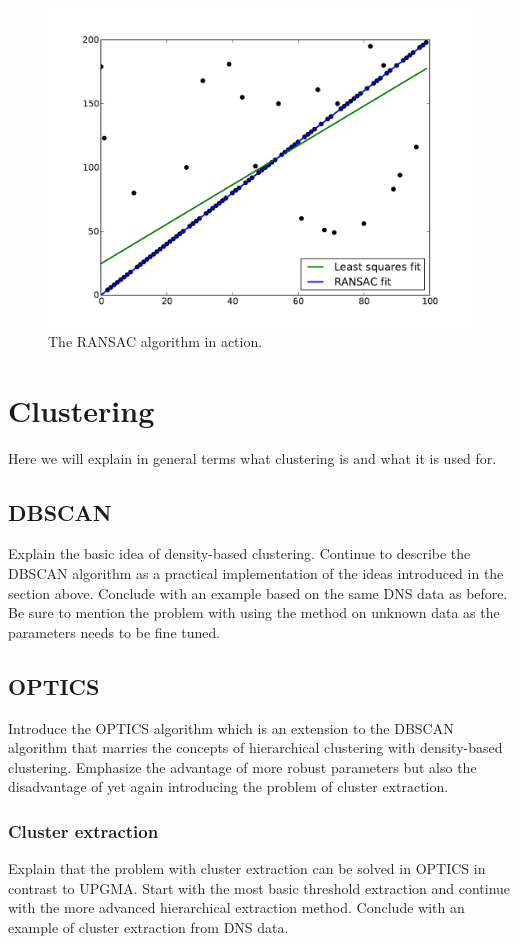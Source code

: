 \documentclass[a4paper]{report}
\begin{document}
\begin{figure}[h]
    \includegraphics[width=\linewidth]{ransac}
    \caption{The RANSAC algorithm in action.}
    \label{fig:ransac}
\end{figure}

\section{Clustering}
Here we will explain in general terms what clustering is and what it is used
for.

\subsection{DBSCAN}
Explain the basic idea of density-based clustering. Continue to describe the
DBSCAN algorithm as a practical implementation of the ideas introduced in the
section above. Conclude with an example based on the same DNS data as before.
Be sure to mention the problem with using the method on unknown data as the
parameters needs to be fine tuned.

\subsection{OPTICS}
Introduce the OPTICS algorithm which is an extension to the DBSCAN algorithm
that marries the concepts of hierarchical clustering with density-based
clustering. Emphasize the advantage of more robust parameters but also the
disadvantage of yet again introducing the problem of cluster extraction.

\subsubsection{Cluster extraction}
Explain that the problem with cluster extraction can be solved in OPTICS in
contrast to UPGMA. Start with the most basic threshold extraction and continue
with the more advanced hierarchical extraction method. Conclude with an example
of cluster extraction from DNS data.
\end{document}
